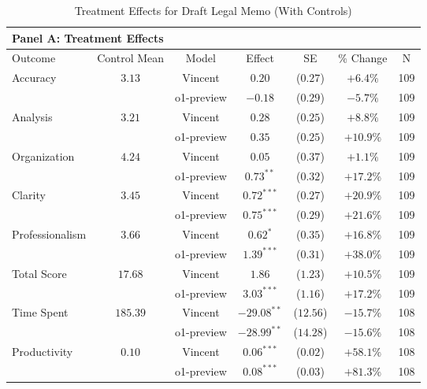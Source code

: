 \begin{table}[!htbp]
\centering
\caption{Treatment Effects for Draft Legal Memo (With Controls)}
\label{tab:task2_effects_controls}
\vspace{0.3cm}
\begin{tabular}{lcccccc}
\multicolumn{7}{l}{\textbf{Panel A: Treatment Effects}} \\
\hline\hline
Outcome & Control Mean & Model & Effect & SE & \% Change & N \\
\hline
\multirow{2}{*}{Accuracy} & \multirow{2}{*}{$3.13$} & Vincent & $0.20$ & ($0.27$) & $+6.4\%$ & 109 \\
& & o1-preview & $-0.18$ & ($0.29$) & $-5.7\%$ & 109 \\
\hline
\multirow{2}{*}{Analysis} & \multirow{2}{*}{$3.21$} & Vincent & $0.28$ & ($0.25$) & $+8.8\%$ & 109 \\
& & o1-preview & $0.35$ & ($0.25$) & $+10.9\%$ & 109 \\
\hline
\multirow{2}{*}{Organization} & \multirow{2}{*}{$4.24$} & Vincent & $0.05$ & ($0.37$) & $+1.1\%$ & 109 \\
& & o1-preview & $0.73^{**}$ & ($0.32$) & $+17.2\%$ & 109 \\
\hline
\multirow{2}{*}{Clarity} & \multirow{2}{*}{$3.45$} & Vincent & $0.72^{***}$ & ($0.27$) & $+20.9\%$ & 109 \\
& & o1-preview & $0.75^{***}$ & ($0.29$) & $+21.6\%$ & 109 \\
\hline
\multirow{2}{*}{Professionalism} & \multirow{2}{*}{$3.66$} & Vincent & $0.62^{*}$ & ($0.35$) & $+16.8\%$ & 109 \\
& & o1-preview & $1.39^{***}$ & ($0.31$) & $+38.0\%$ & 109 \\
\hline
\multirow{2}{*}{Total Score} & \multirow{2}{*}{$17.68$} & Vincent & $1.86$ & ($1.23$) & $+10.5\%$ & 109 \\
& & o1-preview & $3.03^{***}$ & ($1.16$) & $+17.2\%$ & 109 \\
\hline
\multirow{2}{*}{Time Spent} & \multirow{2}{*}{$185.39$} & Vincent & $-29.08^{**}$ & ($12.56$) & $-15.7\%$ & 108 \\
& & o1-preview & $-28.99^{**}$ & ($14.28$) & $-15.6\%$ & 108 \\
\hline
\multirow{2}{*}{Productivity} & \multirow{2}{*}{$0.10$} & Vincent & $0.06^{***}$ & ($0.02$) & $+58.1\%$ & 108 \\
& & o1-preview & $0.08^{***}$ & ($0.03$) & $+81.3\%$ & 108 \\
\hline
\end{tabular}


\end{table}
